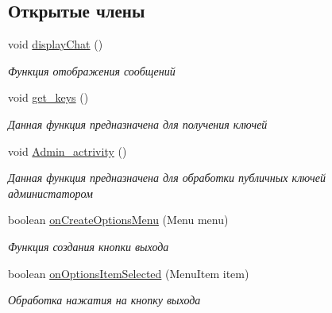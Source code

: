 \subsection*{Открытые члены}
\begin{DoxyCompactItemize}
\item 
void \mbox{\hyperlink{classcom_1_1example_1_1firebasechat_1_1_chat_room_a4523f252ff4e59d283df68e2844d8019}{display\+Chat}} ()
\begin{DoxyCompactList}\small\item\em Функция отображения сообщений \end{DoxyCompactList}\item 
void \mbox{\hyperlink{classcom_1_1example_1_1firebasechat_1_1_chat_room_a581058422cc44701b83f7c2a298406a9}{get\+\_\+keys}} ()
\begin{DoxyCompactList}\small\item\em Данная функция предназначена для получения ключей \end{DoxyCompactList}\item 
void \mbox{\hyperlink{classcom_1_1example_1_1firebasechat_1_1_chat_room_a2772aea181483bc52c5fdffcf7fb9f79}{Admin\+\_\+actrivity}} ()
\begin{DoxyCompactList}\small\item\em Данная функция предназначена для обработки публичных ключей администатором \end{DoxyCompactList}\item 
boolean \mbox{\hyperlink{classcom_1_1example_1_1firebasechat_1_1_chat_room_a2c0ed8faa3bb7d8d5ac7959292c113fa}{on\+Create\+Options\+Menu}} (Menu menu)
\begin{DoxyCompactList}\small\item\em Функция создания кнопки выхода \end{DoxyCompactList}\item 
boolean \mbox{\hyperlink{classcom_1_1example_1_1firebasechat_1_1_chat_room_a278ca3b8374bddc73823cf42eeb62ba2}{on\+Options\+Item\+Selected}} (Menu\+Item item)
\begin{DoxyCompactList}\small\item\em Обработка нажатия на кнопку выхода \end{DoxyCompactList}\end{DoxyCompactItemize}
